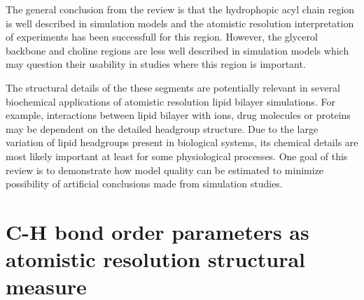 \documentclass[aps,prl,superscriptaddress,twocolumn]{revtex4}
\begin{document}
The general conclusion from the review is that the hydrophopic acyl chain region is well described
in simulation models and the atomistic resolution interpretation of experiments has been successfull 
for this region. However, the glycerol backbone and choline regions are less well described in simulation models which may question their usability in studies where this region is important.

The structural details of the these segments are potentially relevant in several biochemical
applications of atomistic resolution lipid bilayer simulations. For example, 
interactions between lipid bilayer with ions, drug molecules or proteins may be dependent
on the detailed headgroup structure. Due to the large variation of lipid headgroups present
in biological systems, its chemical details are most likely important at least for some
physiological processes. One goal of this review is to demonstrate how model quality can 
be estimated to minimize possibility of artificial conclusions made from simulation studies.




\section{C-H bond order parameters as atomistic resolution structural measure}



\end{document}
